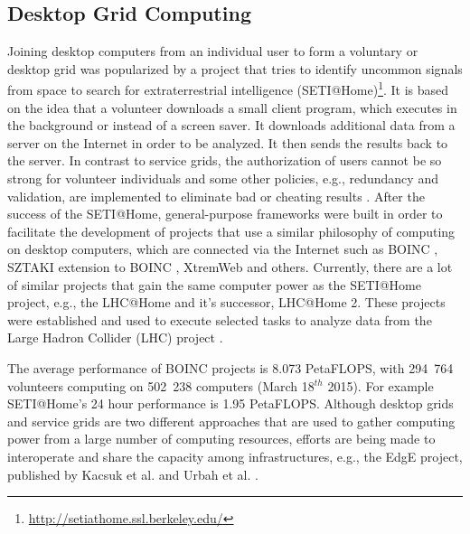 \subsection{Desktop Grid Computing}
\label{sec:desktopgrid}
Joining desktop computers from an individual user to form a voluntary or desktop grid was popularized by a project that tries to identify uncommon signals from space to search for extraterrestrial intelligence (SETI@Home)\footnote{\url{http://setiathome.ssl.berkeley.edu/}}. It is based on the idea that a volunteer downloads a small client program, which executes in the background or instead of a screen saver. It downloads additional data from a server on the Internet in order to be analyzed. It then sends the results back to the server. In contrast to service grids, the authorization of users cannot be so strong for volunteer individuals and some other policies, e.g., redundancy and validation, are implemented to eliminate bad or cheating results \cite{Anderson2002}. After the success of the SETI@Home, general-purpose frameworks were built in order to facilitate the development of projects that use a similar philosophy of computing on desktop computers, which are connected via the Internet such as BOINC \cite{Anderson2004}, SZTAKI extension to BOINC \cite{Balaton2007,Kacsuk2009}, XtremWeb \cite{Fedak2001} and others. Currently, there are a lot of similar projects that gain the same computer power as the SETI@Home project, e.g., the LHC@Home and it's successor, LHC@Home 2. These projects were established and used to execute  selected tasks to analyze data from the Large Hadron Collider (LHC) project \cite{Herr2006,Hoimyr2012}.

The average performance of BOINC projects is 8.073 PetaFLOPS,  with 294~764 volunteers computing on 502~238 computers (March 18$^{th}$ 2015). For example SETI@Home's 24 hour performance is 1.95 PetaFLOPS. Although desktop grids and service grids are two different approaches that are used to gather computing power from a large number of computing resources, efforts are being made to interoperate and share the capacity among infrastructures, e.g., the EdgE project, published by Kacsuk et al.\cite{Kacsuk2008}  and Urbah et al. \cite{Urbah2009}.

